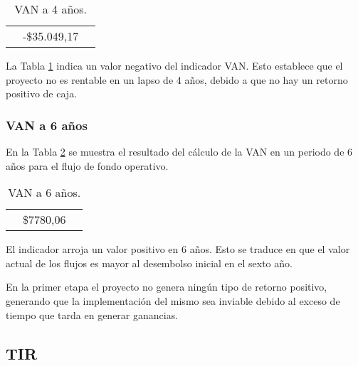 \begin{table}[H]
  \centering
    \begin{tabular}{|cc|r|}
    \rowcolor[rgb]{ .773,  .851,  .945} \multicolumn{3}{c}{\textbf{a 4 años}} \bigstrut[b]\\
    \hline
    \rowcolor[rgb]{ .773,  .851,  .945} \multicolumn{2}{|c|}{\textbf{VAN }} & \cellcolor[rgb]{ 1,  1,  1}\textcolor[rgb]{ 1,  0,  0}{-\$35.049,17} \bigstrut\\
    \hline
    \end{tabular}%
  \caption{VAN a 4 años.}  
  \label{tab:van-4}%
\end{table}%


La Tabla \ref{tab:van-4} indica un valor negativo del indicador VAN. Esto establece que el proyecto no es rentable en un lapso de 4 años, debido a que no hay un retorno positivo de caja. 

\subsubsection{VAN a 6 años}

En la Tabla \ref{tab:van-6} se muestra el resultado del cálculo de la VAN en un periodo de 6 años para el flujo de fondo operativo.

\begin{table}[H]
  \centering

    \begin{tabular}{|cc|r|}
    \rowcolor[rgb]{ .773,  .851,  .945} \multicolumn{3}{c}{\textbf{a 6 años}} \bigstrut[b]\\
    \hline
    \rowcolor[rgb]{ .773,  .851,  .945} \multicolumn{2}{|c|}{\textbf{VAN }} & \cellcolor[rgb]{ 1,  1,  1}\$7780,06 \bigstrut\\
    \hline
    \end{tabular}%
  \caption{VAN a 6 años.}    
  \label{tab:van-6}%
\end{table}%


El indicador arroja un valor positivo en 6 años. Esto se traduce en que el valor actual de los flujos es mayor al desembolso inicial en el sexto año.

En la primer etapa el proyecto no genera ningún tipo de retorno positivo, generando que la implementación del mismo sea inviable debido al exceso de tiempo que tarda en generar ganancias.

\subsection{TIR}

